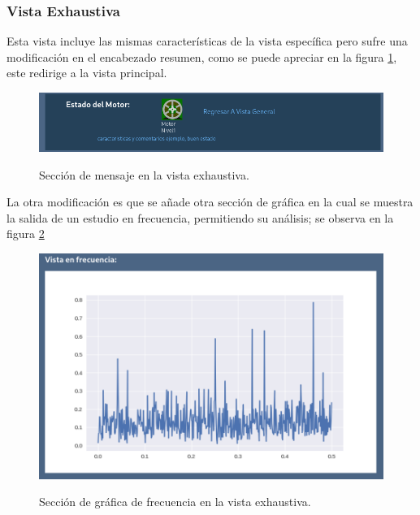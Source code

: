 \documentclass[12pt]{article}
\begin{document}
\subsubsection{Vista Exhaustiva}
Esta vista incluye las mismas características de la vista específica pero sufre
una modificación en el encabezado resumen, como se puede apreciar en la figura
\ref{img:exhaustivaMensajeManual},
este redirige a la vista principal.

    \begin{figure}[H]
		\centering
        \caption{Sección de mensaje en la vista exhaustiva. }
        \includegraphics[width=\linewidth]{ManualUsuario/exhaustivaMensaje.png}
        \label{img:exhaustivaMensajeManual}
	\end{figure}



La otra modificación es que se añade otra sección de gráfica en la cual se muestra
la salida de un estudio en frecuencia, permitiendo su análisis; se observa en
la figura \ref{img:exhaustivaGraficaFourierManual}


    \begin{figure}[H]
		\centering
        \caption{Sección de gráfica de frecuencia en la vista exhaustiva. }
        \includegraphics[width=\linewidth]{ManualUsuario/exhaustivaGraficaFourier.png}
        \label{img:exhaustivaGraficaFourierManual}
	\end{figure}
\end{document}
